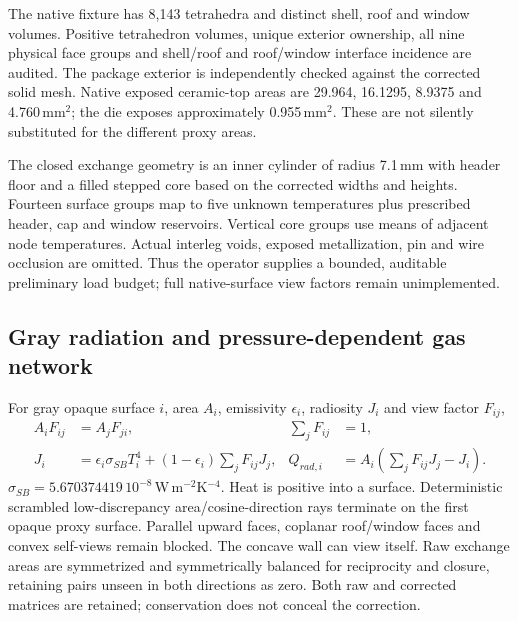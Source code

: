 \documentclass[11pt,a4paper]{article}
\begin{document}
The native fixture has 8,143 tetrahedra and distinct shell, roof and window volumes. Positive tetrahedron volumes, unique exterior ownership, all nine physical face groups and shell/roof and roof/window interface incidence are audited. The package exterior is independently checked against the corrected solid mesh. Native exposed ceramic-top areas are 29.964, 16.1295, 8.9375 and 4.760\,mm$^2$; the die exposes approximately 0.955\,mm$^2$. These are not silently substituted for the different proxy areas.

The closed exchange geometry is an inner cylinder of radius 7.1\,mm with header floor and a filled stepped core based on the corrected widths and heights. Fourteen surface groups map to five unknown temperatures plus prescribed header, cap and window reservoirs. Vertical core groups use means of adjacent node temperatures. Actual interleg voids, exposed metallization, pin and wire occlusion are omitted. Thus the operator supplies a bounded, auditable preliminary load budget; full native-surface view factors remain unimplemented.

\clearpage
\subsection{Gray radiation and pressure-dependent gas network}
For gray opaque surface $i$, area $A_i$, emissivity $\epsilon_i$, radiosity $J_i$ and view factor $F_{ij}$,
\begin{align}
A_iF_{ij}&=A_jF_{ji}, & \sum_j F_{ij}&=1,\\
J_i&=\epsilon_i\sigma_{SB}T_i^4+(1-\epsilon_i)\sum_jF_{ij}J_j, &
Q_{rad,i}&=A_i\left(\sum_jF_{ij}J_j-J_i\right).
\end{align}
$\sigma_{SB}=5.670374419\,10^{-8}$\,W\,m$^{-2}$K$^{-4}$. Heat is positive into a surface. Deterministic scrambled low-discrepancy area/cosine-direction rays terminate on the first opaque proxy surface. Parallel upward faces, coplanar roof/window faces and convex self-views remain blocked. The concave wall can view itself. Raw exchange areas are symmetrized and symmetrically balanced for reciprocity and closure, retaining pairs unseen in both directions as zero. Both raw and corrected matrices are retained; conservation does not conceal the correction.
\end{document}
